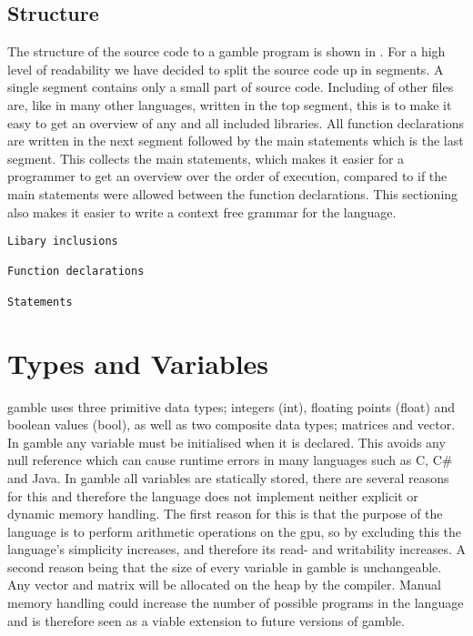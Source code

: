 \subsection*{Structure}\label{subsec:Struc}
The structure of the source code to a \gls{gamble} program is shown in .
For a high level of readability we have decided  to split the source code up in segments.
A single segment contains only a small part of source code.
Including of other files are, like in many other languages, written in the top segment, this is to make it easy to get an overview of any and all included libraries. 
All function declarations are written in the next segment followed by the main statements which is the last segment.
This collects the main statements, which makes it easier for a programmer to get an overview over the order of execution, compared to if the main statements were allowed between the function declarations.
This sectioning also makes it easier to write a context free grammar for the language.

\begin{lstlisting}[caption={Source code file layout in \gls{gamble}},frame=tlrb,label={lst:Structure}, numbers=none]
Libary inclusions

Function declarations

Statements
\end{lstlisting}

\section{Types and Variables} \label{sec:Types}
\gls{gamble} uses three primitive data types; integers (int), floating points (float) and boolean values (bool), as well as two composite data types; matrices and vector. 
In \gls{gamble} any variable must be initialised when it is declared. 
This avoids any null reference which can cause runtime errors in many languages such as C, C\# and Java.
In \gls{gamble} all variables are statically stored, there are several reasons for this and therefore the language does not implement neither explicit or dynamic memory handling.
The first reason for this is that the purpose of the language is to perform arithmetic operations on the \acrshort{gpu}, so by excluding this the language's simplicity increases, and therefore its read- and writability increases.
A second reason being that the size of every variable in \gls{gamble} is unchangeable.
Any vector and matrix will be allocated on the heap by the compiler.
Manual memory handling could increase the number of possible programs in the language and is therefore seen as a viable extension to future versions of \gls{gamble}.


